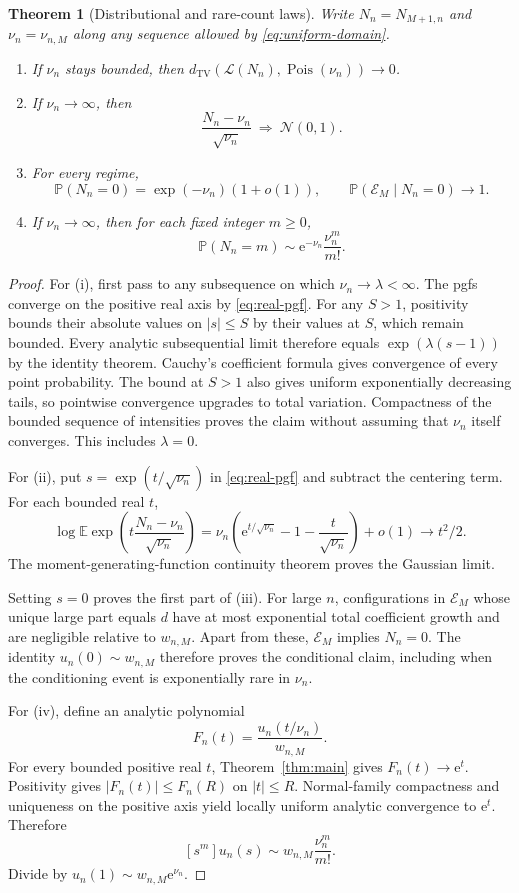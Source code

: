 \documentclass[11pt,a4paper]{article}
\numberwithin{equation}{section}
\newtheorem{theorem}{Theorem}[section]
\theoremstyle{definition}
\theoremstyle{remark}
\newcommand{\ee}{\mathrm e}\newcommand{\dd}{\mathrm d}
\newcommand{\E}{\mathbb E}\newcommand{\Prob}{\mathbb P}
\newcommand{\Normal}{\mathcal N}\newcommand{\Pois}{\operatorname{Pois}}
\newcommand{\TV}{d_{\mathrm{TV}}}
\begin{document}
\begin{theorem}[Distributional and rare-count laws]
\label{thm:probability}
Write $N_n=N_{M+1,n}$ and $\nu_n=\nu_{n,M}$ along any sequence allowed by
\eqref{eq:uniform-domain}.
\begin{enumerate}[label=(\roman*)]
\item If $\nu_n$ stays bounded, then
$\TV(\mathcal L(N_n),\Pois(\nu_n))\to0$.
\item If $\nu_n\to\infty$, then
\[
 \frac{N_n-\nu_n}{\sqrt{\nu_n}}\ \Longrightarrow\ \Normal(0,1).
\]
\item For every regime,
\[
 \Prob(N_n=0)=\exp(-\nu_n)(1+o(1)),\qquad
 \Prob(\mathcal E_M\mid N_n=0)\to1.
\]
\item If $\nu_n\to\infty$, then for each fixed integer $m\ge0$,
\[
 \Prob(N_n=m)\sim\ee^{-\nu_n}\frac{\nu_n^m}{m!}.
\]
\end{enumerate}
\end{theorem}
\begin{proof}
For (i), first pass to any subsequence on which $\nu_n\to\lambda<\infty$.
The pgfs converge on the positive real axis by \eqref{eq:real-pgf}.
For any $S>1$, positivity bounds their absolute values on $|s|\le S$ by
their values at $S$, which remain bounded. Every analytic subsequential
limit therefore equals $\exp(\lambda(s-1))$ by the identity theorem.
Cauchy's coefficient formula gives convergence of every point probability.
The bound at $S>1$ also gives uniform exponentially decreasing tails, so
pointwise convergence upgrades to total variation. Compactness of the
bounded sequence of intensities proves the claim without assuming that
$\nu_n$ itself converges. This includes $\lambda=0$.

For (ii), put $s=\exp(t/\sqrt{\nu_n})$ in \eqref{eq:real-pgf} and subtract
the centering term. For each bounded real $t$,
\[
 \log\E\exp\left(t\frac{N_n-\nu_n}{\sqrt{\nu_n}}\right)
 =\nu_n\left(\ee^{t/\sqrt{\nu_n}}-1-\frac{t}{\sqrt{\nu_n}}\right)+o(1)
 \longrightarrow t^2/2.
\]
The moment-generating-function continuity theorem proves the Gaussian limit.

Setting $s=0$ proves the first part of (iii). For large $n$, configurations
in $\mathcal E_M$ whose unique large part equals $d$ have at most
exponential total coefficient growth and are negligible relative to
$w_{n,M}$. Apart from these, $\mathcal E_M$ implies $N_n=0$.
The identity $u_n(0)\sim w_{n,M}$ therefore proves the conditional claim,
including when the conditioning event is exponentially rare in $\nu_n$.

For (iv), define an analytic polynomial
\[
 F_n(t)=\frac{u_n(t/\nu_n)}{w_{n,M}}.
\]
For every bounded positive real $t$, Theorem~\ref{thm:main} gives
$F_n(t)\to\ee^t$. Positivity gives $|F_n(t)|\le F_n(R)$ on $|t|\le R$.
Normal-family compactness and uniqueness on the positive axis yield
locally uniform analytic convergence to $\ee^t$. Therefore
\[
 [s^m]u_n(s)\sim w_{n,M}\frac{\nu_n^m}{m!}.
\]
Divide by $u_n(1)\sim w_{n,M}\ee^{\nu_n}$.
\end{proof}
\end{document}
